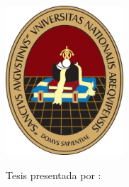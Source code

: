 \begin{titlepage}
    {
    
    \begin{center}
        \setlength{\parskip}{0pt} %
        {\fontsize{14}{14}\selectfont
        \VarInstitucion \par}
        
        {\fontsize{12}{16}\selectfont
        \VarFacultad \par
        \VarEscuela \par}
        
        \vfill\vspace{0.3cm}
        
        \includegraphics[width=0.33\textwidth]{assets/cover-page/UNSA logo.jpg}
        
        \vfill\vspace{0.3cm}
        
        \begin{flushleft}
        {\fontsize{12}{10}\selectfont\bfseries{
        \VarTituloTesis
        }\par}
        \end{flushleft}
    \end{center}
    }
    
    \vfill\vspace{0.3cm}\par
    
    {
    \fontsize{12}{10}\selectfont
    
    \begin{adjustwidth}{0.52\textwidth}{} %
        
        
        {
            \noindent {}Tesis presentada por :\par
        \noindent \VarAutorUno \par
        \noindent \VarAutorDos \par
        }
        

\end{adjustwidth}}
\end{titlepage}
